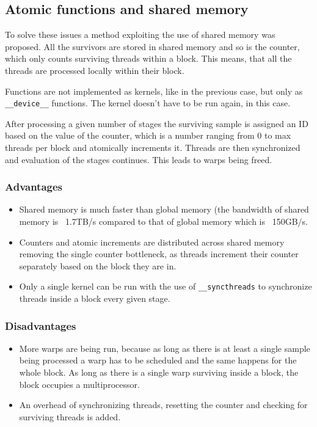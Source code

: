 \subsection{Atomic functions and shared memory}\label{subsec:impl-shared}

To solve these issues a method exploiting the use of shared memory was proposed. All the survivors are stored in shared memory and so is the counter, which only counts surviving threads within a block. This means, that all the threads are processed locally within their block.

Functions are not implemented as kernels, like in the previous case, but only as \verb|__device__| functions. The kernel doesn't have to be run again,  in this case.

After processing a given number of stages the surviving sample is assigned an ID based on the value of the counter, which is a number ranging from 0 to max threads per block and atomically increments it. Threads are then synchronized and evaluation of the stages continues. This leads to warps being freed.

\subsubsection{Advantages}

\begin{itemize}
	\item Shared memory is much faster than global memory (the bandwidth of shared memory is ~1.7TB/s compared to that of global memory which is ~150GB/s.
	\item Counters and atomic increments are distributed across shared memory removing the single counter bottleneck, as threads increment their counter separately based on the block they are in.
	\item Only a single kernel can be run with the use of \verb|__syncthreads| to synchronize threads inside a block every given stage.
\end{itemize}

\subsubsection{Disadvantages}

\begin{itemize}
	\item More warps are being run, because as long as there is at least a single sample being processed a warp has to be scheduled and the same happens for the whole block. As long as there is a single warp surviving inside a block, the block occupies a multiprocessor.
	\item An overhead of synchronizing threads, resetting the counter and checking for surviving threads is added.
\end{itemize}

